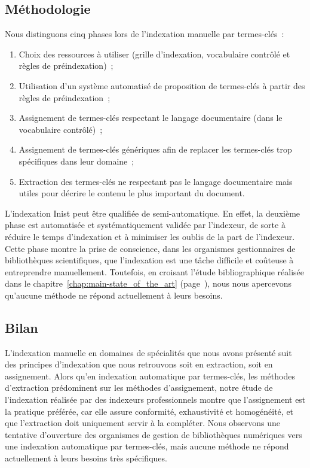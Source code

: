     \subsection{Méthodologie}
    \label{subsec:main-domain_specific_keyphrase_annotation-manual_keyphrase_annotation-methodology}
      Nous distinguons cinq phases lors de l'indexation manuelle par
      termes-clés~:
      \begin{enumerate}
        \item{Choix des ressources à utiliser (grille d'indexation, vocabulaire
              contrôlé et règles de préindexation)~;}
        \item{Utilisation d'un système automatisé de proposition de termes-clés
              à partir des règles de préindexation~;}
        \item{Assignement de termes-clés respectant le langage documentaire
              (dans le vocabulaire contrôlé)~;}
        \item{Assignement de termes-clés génériques afin de replacer les
              termes-clés trop spécifiques dans leur domaine~;}
        \item{Extraction des termes-clés ne respectant pas le langage
              documentaire mais utiles pour décrire le contenu le plus important
              du document.}
      \end{enumerate}

      L'indexation Inist peut être qualifiée de semi-automatique. En effet, la
      deuxième phase est automatisée et systématiquement validée par l'indexeur,
      de sorte à réduire le temps d'indexation et à minimiser les oublis de la
      part de l'indexeur. Cette phase montre la prise de conscience, dans les
      organismes gestionnaires de bibliothèques scientifiques, que l'indexation
      est une tâche difficile et coûteuse à entreprendre manuellement.
      Toutefois, en croisant l'étude bibliographique réalisée dans le
      chapitre~\ref{chap:main-state_of_the_art}
      (page~\pageref{chap:main-state_of_the_art}), nous nous apercevons
      qu'aucune méthode ne répond actuellement à leurs besoins.

    \subsection{Bilan}
    \label{subsec:main-domain_specific_keyphrase_annotation-manual_keyphrase_annotation-conclusion}
      L'indexation manuelle en domaines de spécialités que nous avons présenté
      suit des principes d'indexation que nous retrouvons soit en extraction,
      soit en assignement. Alors qu'en indexation automatique par termes-clés,
      les méthodes d'extraction prédominent sur les méthodes d'assignement,
      notre étude de l'indexation réalisée par des indexeurs professionnels
      montre que l'assignement est la pratique préférée, car elle assure
      conformité, exhaustivité et homogénéité, et que l'extraction doit
      uniquement servir à la compléter. Nous observons une tentative d'ouverture
      des organismes de gestion de bibliothèques numériques vers une indexation
      automatique par termes-clés, mais aucune méthode ne répond actuellement à
      leurs besoins très spécifiques.

